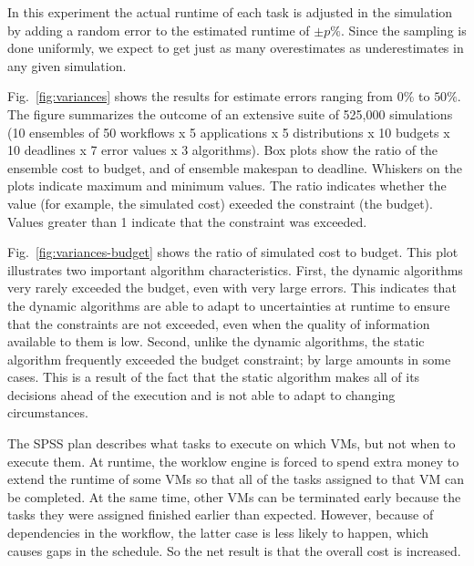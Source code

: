 \documentclass[conference]{IEEEtran}
\begin{document}
In this experiment the actual runtime of each task is adjusted in the
simulation by adding a random error to the estimated runtime of $\pm p\%$.
Since the sampling is done uniformly, we expect to get just as many
overestimates as underestimates in any given simulation.

Fig.~\ref{fig:variances} shows the results for estimate errors
ranging from $0\%$ to $50\%$. The figure summarizes the outcome of an
extensive suite of 525,000 simulations (10 ensembles of 50 workflows x 5
applications x 5 distributions x 10 budgets x 10 deadlines x 7 error values x
3 algorithms). Box plots show the ratio of the ensemble cost to
budget, and of ensemble makespan to deadline. Whiskers on the plots
indicate maximum and minimum values. The ratio indicates whether the value 
(for example, the simulated cost) exeeded the constraint (the budget). Values
greater than 1 indicate that the constraint was exceeded. 

Fig.~\ref{fig:variances-budget} shows the ratio of simulated cost to budget. This
plot illustrates two important algorithm characteristics. First, the dynamic
algorithms very rarely exceeded the budget, even with very large errors. This
indicates that the dynamic algorithms are able to adapt to uncertainties at
runtime to ensure that the constraints are not exceeded, even when the quality
of information available to them is low. Second, unlike the dynamic
algorithms, the static algorithm frequently exceeded the budget constraint; by
large amounts in some cases. This is a result of the fact that the static
algorithm makes all of its decisions ahead of the execution and is not able to adapt
to changing circumstances.

The SPSS plan describes what tasks to execute on which VMs, but not when to
execute them. At runtime, the worklow engine is forced to spend extra money
to extend the runtime of some VMs so that all of the tasks assigned to that
VM can be completed. At the same time, other VMs can be terminated early
because the tasks they were assigned finished earlier than expected. However,
because of dependencies in the workflow, the latter case is less likely to
happen, which causes gaps in the schedule. So the net result is that the
overall cost is increased.
\end{document}
